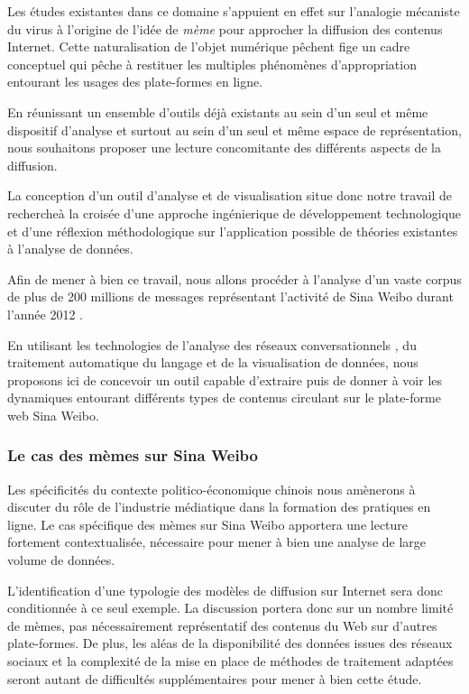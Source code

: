 Les études existantes dans ce domaine \cite{Leskovec1996, Adamic2014} s'appuient en effet sur l'analogie mécaniste du virus à l'origine de l'idée de \textit{mème} \cite{Dawkins1984, Blackmore2001} pour approcher la diffusion des contenus Internet. Cette naturalisation de l'objet numérique pêchent fige un cadre conceptuel qui pêche à restituer les multiples phénomènes d'appropriation entourant les usages des plate-formes en ligne.

En réunissant un ensemble d'outils déjà existants au sein d'un seul et même dispositif d'analyse et surtout au sein d'un seul et même espace de représentation, nous souhaitons proposer une lecture concomitante des différents aspects de la diffusion.

La conception d'un outil d'analyse et de visualisation situe donc notre travail de rechercheà la croisée d'une approche ingénierique de développement technologique et d'une réflexion méthodologique sur l'application possible de théories existantes à l'analyse de données.

Afin de mener à bien ce travail, nous allons procéder à l'analyse d'un vaste corpus de plus de 200 millions de messages représentant l'activité de Sina Weibo durant l'année 2012 \cite{Fu2013}. 

En utilisant les technologies de l'analyse des réseaux conversationnels \cite{Weng2013}, du traitement automatique du langage et de la visualisation de données, nous proposons ici de concevoir un outil capable d'extraire puis de donner à voir les dynamiques entourant différents types de contenus circulant sur le plate-forme web Sina Weibo.


\subsubsection{Le cas des mèmes sur Sina Weibo}

Les spécificités du contexte politico-économique chinois nous amènerons à discuter du rôle de l'industrie médiatique dans la formation des pratiques en ligne. Le cas spécifique des mèmes sur Sina Weibo apportera une lecture fortement contextualisée, nécessaire pour mener à bien une analyse de large volume de données.

L'identification d'une typologie des modèles de diffusion sur Internet sera donc conditionnée à ce seul exemple. La discussion portera donc sur un nombre limité de mèmes, pas nécessairement représentatif des contenus du Web sur d'autres plate-formes. De plus, les aléas de la disponibilité des données issues des réseaux sociaux et la complexité de la mise en place de méthodes de traitement adaptées seront autant de difficultés supplémentaires pour mener à bien cette étude. 

